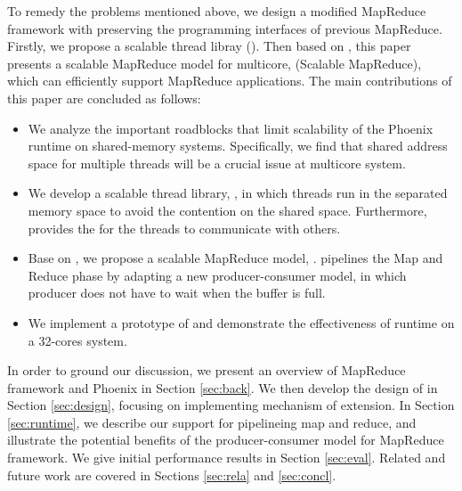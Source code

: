 
To remedy the problems mentioned above, we design a modified MapReduce framework with preserving the programming interfaces of previous MapReduce.
Firstly, we propose a scalable thread libray (\myth).
Then based on \myth, this paper presents a scalable MapReduce model for multicore, \myds(Scalable MapReduce), which can efficiently support MapReduce applications.
The main contributions of this paper are concluded as follows:
\begin{itemize}
  \item We analyze the important roadblocks that limit scalability of the Phoenix runtime on shared-memory systems. Specifically, we find that shared address space for multiple threads will be a crucial issue at multicore system.
  
  \item We develop a scalable thread library, \myth, in which threads run in  the separated memory space to avoid the contention on the shared space. Furthermore, \myth provides the  for the threads to communicate with others. 

  \item Base on \myth, we propose a scalable MapReduce model, \myds.
  \myds pipelines the Map and Reduce phase by adapting a new producer-consumer model, in which producer does not have to wait when the buffer is full. 

  \item We implement a prototype of \myth and demonstrate the effectiveness of \myds runtime on a 32-cores system. 
\end{itemize}

In order to ground our discussion, we present an overview of MapReduce framework and Phoenix in Section \ref{sec:back}. 
We then develop the design of \myth in Section \ref{sec:design}, focusing  on implementing mechanism of extension. 
In Section \ref{sec:runtime}, we describe our support for pipelineing map and reduce, and illustrate the potential benefits of the producer-consumer model for MapReduce framework.
We give initial performance results in Section \ref{sec:eval}. 
Related and future work are covered in Sections \ref{sec:rela} and \ref{sec:concl}.

